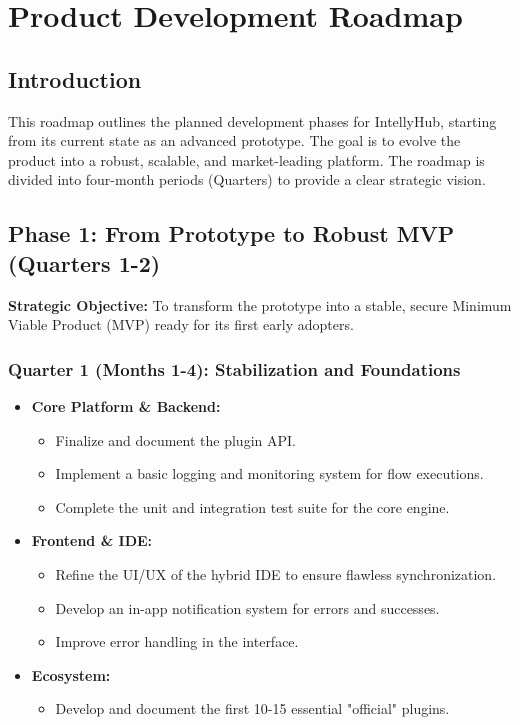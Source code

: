 \documentclass[11pt, a4paper, oneside]{article}
\begin{document}
\section{Product Development Roadmap} %
\subsection*{Introduction}
This roadmap outlines the planned development phases for IntellyHub, starting from its current state as an advanced prototype. The goal is to evolve the product into a robust, scalable, and market-leading platform. The roadmap is divided into four-month periods (Quarters) to provide a clear strategic vision.

\clearpage

\subsection{Phase 1: From Prototype to Robust MVP (Quarters 1-2)}
\textbf{Strategic Objective:} To transform the prototype into a stable, secure Minimum Viable Product (MVP) ready for its first early adopters.

\subsubsection*{Quarter 1 (Months 1-4): Stabilization and Foundations}
\begin{itemize}[leftmargin=*]
    \item \textbf{Core Platform \& Backend:}
    \begin{itemize}
        \item Finalize and document the plugin API.
        \item Implement a basic logging and monitoring system for flow executions.
        \item Complete the unit and integration test suite for the core engine.
    \end{itemize}
    \item \textbf{Frontend \& IDE:}
    \begin{itemize}
        \item Refine the UI/UX of the hybrid IDE to ensure flawless synchronization.
        \item Develop an in-app notification system for errors and successes.
        \item Improve error handling in the interface.
    \end{itemize}
    \item \textbf{Ecosystem:}
    \begin{itemize}
        \item Develop and document the first 10-15 essential "official" plugins.
    \end{itemize}
\end{itemize}
\end{document}

